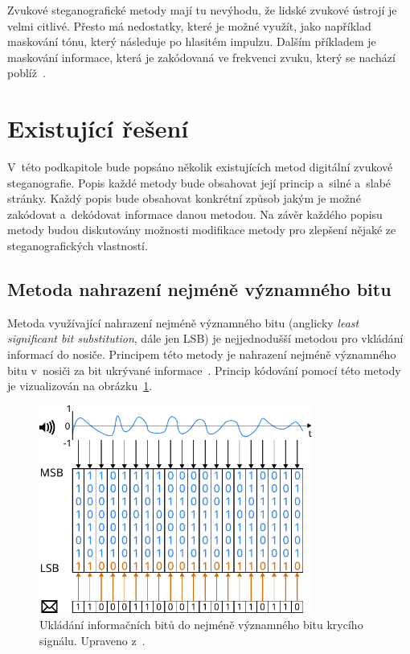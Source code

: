 Zvukové steganografické metody mají tu nevýhodu, že lidské zvukové ústrojí je
velmi citlivé. Přesto má nedostatky, které je možné využít, jako například
maskování tónu, který následuje po hlasitém impulzu. Dalším příkladem je
maskování informace, která je zakódovaná ve frekvenci zvuku, který se nachází
poblíž~\cite{Dutta2020}.

\section{Existující řešení}
\label{sec:existing-methods}

V~této podkapitole bude popsáno několik existujících metod digitální zvukové
steganografie. Popis každé metody bude obsahovat její princip a~silné a~slabé
stránky. Každý popis bude obsahovat konkrétní způsob jakým je možné zakódovat
a~dekódovat informace danou metodou. Na závěr každého popisu metody budou
diskutovány možnosti modifikace metody pro zlepšení nějaké ze steganografických
vlastností.

\subsection*{Metoda nahrazení nejméně významného bitu}
\label{sub:lsb}

Metoda využívající nahrazení nejméně významného bitu (anglicky \textit{least
significant bit substitution}, dále jen LSB) je nejjednodušší metodou pro
vkládání informací do nosiče. Principem této metody je nahrazení nejméně
významného bitu v~nosiči za bit ukrývané informace~\cite{Dutta2020}. Princip
kódování pomocí této metody je vizualizován na obrázku~\ref{pic:lsb-diagram}.

\begin{figure}[hbt]
    \centering
    \includegraphics[width=0.8\textwidth]{obrazky/lsb-diagram.pdf}
    \caption{Ukládání informačních bitů do nejméně významného bitu krycího
    signálu. Upraveno z~\cite{Djebbar2012}.}
    \label{pic:lsb-diagram}
\end{figure}

